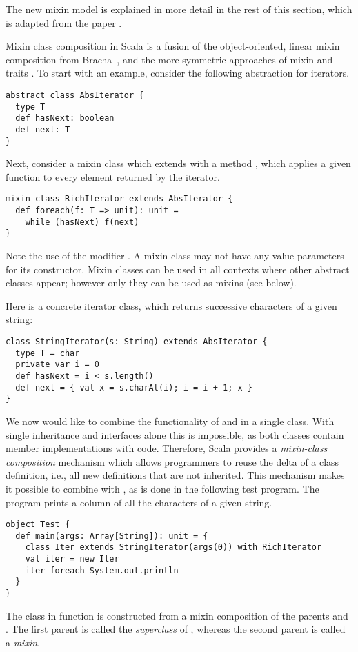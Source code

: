 \documentclass[a4paper,11pt,twoside]{article}
\begin{document}
The new mixin model is explained in more detail in the rest of this
section, which is adapted from the paper \cite{odersky05sca}.

Mixin class composition in Scala is a fusion of the object-oriented,
linear mixin composition from Bracha~\cite{bracha90mixinbased}, and
the more symmetric approaches of mixin
\cite{duggan96mixins,hirschowitz-leory:02mixin} and traits
\cite{schaerli03traits}.  To start with an example, consider the
following abstraction for iterators.
\begin{lstlisting}
abstract class AbsIterator {
  type T
  def hasNext: boolean
  def next: T
}
\end{lstlisting}
Next, consider a mixin class which extends \lstinline@AbsIterator@
with a method \lstinline@foreach@, which applies a given function to
every element returned by the iterator.
\begin{lstlisting}
mixin class RichIterator extends AbsIterator {
  def foreach(f: T => unit): unit = 
    while (hasNext) f(next)
}
\end{lstlisting}
Note the use of the modifier \lstinline@mixin@. A mixin class may not
have any value parameters for its constructor.  Mixin classes can be
used in all contexts where other abstract classes appear; however only
they can be used as mixins (see below). 

Here is a concrete iterator class, which returns successive characters
of a given string:
\begin{lstlisting}
class StringIterator(s: String) extends AbsIterator {
  type T = char
  private var i = 0
  def hasNext = i < s.length()
  def next = { val x = s.charAt(i); i = i + 1; x }
}
\end{lstlisting}
We now would like to combine the functionality of
\lstinline@RichIterator@ and \lstinline@StringIterator@ in a single
class. With single inheritance and interfaces alone this is
impossible, as both classes contain member implementations with code.
Therefore,
Scala provides a \emph{mixin-class composition} mechanism which
allows programmers to reuse the delta of a class definition, i.e., all
new definitions that are not inherited. This mechanism makes it
possible to combine \lstinline@RichIterator@ with
\lstinline@StringIterator@, as is done in the following test program.
The program prints a column of all the characters of a given string.
\begin{lstlisting}
object Test {
  def main(args: Array[String]): unit = {
    class Iter extends StringIterator(args(0)) with RichIterator
    val iter = new Iter
    iter foreach System.out.println 
  }
}
\end{lstlisting}
The \lstinline@Iter@ class in function \lstinline@main@ is constructed
from a mixin composition of the parents \lstinline@StringIterator@ and
\lstinline@RichIterator@. The first parent is called the {\em
superclass} of \lstinline@Iter@, whereas the second parent is called a
{\em mixin}. 
\medskip
\end{document}
